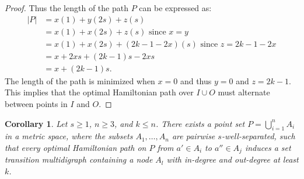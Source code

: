 \documentclass{article}
\newtheorem{corollary}{Corollary}[thm]
\theoremstyle{definition}
\begin{document}
\begin{proof}
    Thus the length of the path $P$ can be expressed as:
    \begin{align*}
        |P| &= x(1) + y(2s) + z(s) \\
        &= x(1) + x(2s) + z(s)\text{ since $x = y$} \\
        &= x(1) + x(2s) + (2k - 1 - 2x)(s)\text{ since $z = 2k - 1 - 2x$} \\
        &= x + 2xs + (2k - 1)s - 2xs \\
        &= x + (2k - 1)s.
    \end{align*}
    The length of the path is minimized when $x = 0$ and thus $y = 0$ and $z = 2k - 1$.
    This implies that the optimal Hamiltonian path over $I \cup O$ must alternate between points in $I$ and $O$.
\end{proof}

\begin{corollary}
    Let $s \geq 1$, $n \geq 3$, and $k \leq n$.
    There exists a point set $P = \bigcup_{i=1}^n A_i$ in a metric space, where the subsets $A_1, \ldots, A_n$ are pairwise $s$-well-separated, such that every optimal Hamiltonian path on $P$ from $a' \in A_i$ to $a'' \in A_j$ induces a set transition multidigraph containing a node $A_l$ with in-degree and out-degree at least $k$.
\end{corollary}
\end{document}
